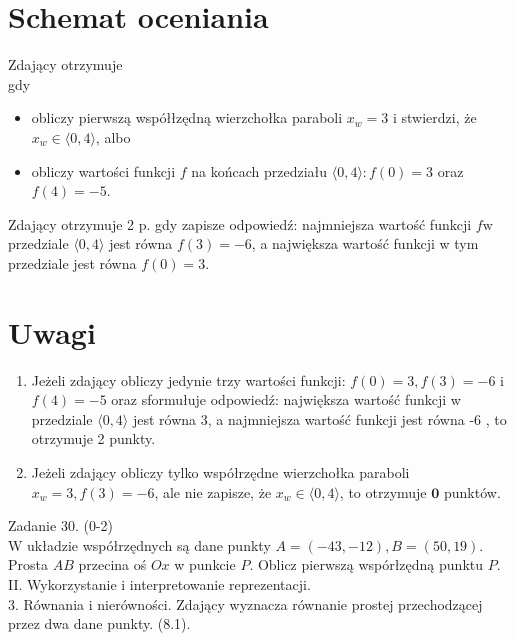 \documentclass[10pt]{article}
\begin{document}
\section*{Schemat oceniania}
Zdający otrzymuje\\
gdy

\begin{itemize}
  \item obliczy pierwszą współłzędną wierzchołka paraboli $x_{w}=3$ i stwierdzi, że $x_{w} \in\langle 0,4\rangle$, albo
  \item obliczy wartości funkcji $f$ na końcach przedziału $\langle 0,4\rangle: f(0)=3$ oraz $f(4)=-5$.
\end{itemize}

Zdający otrzymuje 2 p. gdy zapisze odpowiedź: najmniejsza wartość funkcji $f \mathrm{w}$ przedziale $\langle 0,4\rangle$ jest równa $f(3)=-6$, a największa wartość funkcji w tym przedziale jest równa $f(0)=3$.

\section*{Uwagi}
\begin{enumerate}
  \item Jeżeli zdający obliczy jedynie trzy wartości funkcji: $f(0)=3, f(3)=-6$ i $f(4)=-5$ oraz sformułuje odpowiedź: największa wartość funkcji w przedziale $\langle 0,4\rangle$ jest równa 3, a najmniejsza wartość funkcji jest równa -6 , to otrzymuje 2 punkty.
  \item Jeżeli zdający obliczy tylko współrzędne wierzchołka paraboli $x_{w}=3, f(3)=-6$, ale nie zapisze, że $x_{w} \in\langle 0,4\rangle$, to otrzymuje $\mathbf{0}$ punktów.
\end{enumerate}

Zadanie 30. (0-2)\\
W układzie współrzędnych są dane punkty $A=(-43,-12), B=(50,19)$. Prosta $A B$ przecina oś $O x$ w punkcie $P$. Oblicz pierwszą wspórłzędną punktu $P$.\\
II. Wykorzystanie i interpretowanie reprezentacji.\\
3. Równania i nierówności. Zdający wyznacza równanie prostej przechodzącej przez dwa dane punkty. (8.1).
\end{document}

